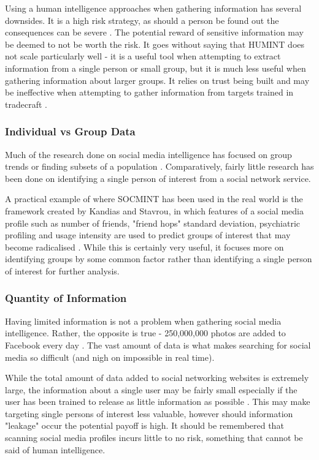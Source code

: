 \documentclass{article}
\begin{document}
Using a human intelligence approaches when gathering information has several downsides. It is a high risk strategy, as should a person be found out the consequences can be severe \citep{humintni}. The potential reward of sensitive information may be deemed to not be worth the risk. It goes without saying that HUMINT does not scale particularly well - it is a useful tool when attempting to extract information from a single person or small group, but it is much less useful when gathering information about larger groups. It relies on trust being built and may be ineffective when attempting to gather information from targets trained in tradecraft \citep{humintni}\citep{clandestinehumint}\citep{humintcyberage}.

\subsubsection{Individual vs Group Data}
Much of the research done on social media intelligence has focused on group trends or finding subsets of a population \citep{socmintpublicsafety}\citep{socmintoverview}. Comparatively, fairly little research has been done on identifying a single person of interest from a social network service.

A practical example of where SOCMINT has been used in the real world is the framework created by Kandias and Stavrou, in which features of a social media profile such as number of friends, "friend hops" standard deviation, psychiatric profiling and usage intensity are used to predict groups of interest that may become radicalised \citep{behaviourdetection}. While this is certainly very useful, it focuses more on identifying groups by some common factor rather than identifying a single person of interest for further analysis.

\subsubsection{Quantity of Information}
Having limited information is not a problem when gathering social media intelligence. Rather, the opposite is true - 250,000,000 photos are added to Facebook every day \citep{socmintoverview}. The vast amount of data is what makes searching for social media so difficult (and nigh on impossible in real time).

While the total amount of data added to social networking websites is extremely large, the information about a single user may be fairly small especially if the user has been trained to release as little information as possible \citep{behaviourdetection}. This may make targeting single persons of interest less valuable, however should information "leakage" occur the potential payoff is high. It should be remembered that scanning social media profiles incurs little to no risk, something that cannot be said of human intelligence.
\end{document}

